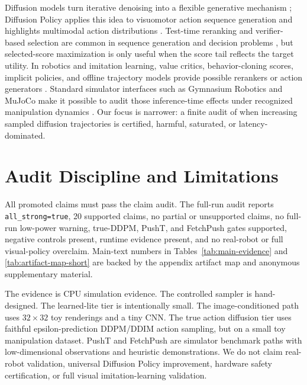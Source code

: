 \documentclass{article}
\begin{document}
Diffusion models turn iterative denoising into a flexible generative mechanism \citep{sohl2015deep,ho2020ddpm,song2020ddim}; Diffusion Policy applies this idea to visuomotor action sequence generation and highlights multimodal action distributions \citep{chi2023diffusionpolicy}. Test-time reranking and verifier-based selection are common in sequence generation and decision problems \citep{cobbe2021training,yao2023tree}, but selected-score maximization is only useful when the score tail reflects the target utility. In robotics and imitation learning, value critics, behavior-cloning scores, implicit policies, and offline trajectory models provide possible rerankers or action generators \citep{florence2022implicit,janner2022diffuser,mandlekar2021robomimic}. Standard simulator interfaces such as Gymnasium Robotics and MuJoCo make it possible to audit those inference-time effects under recognized manipulation dynamics \citep{towers2024gymnasium,todorov2012mujoco}. Our focus is narrower: a finite audit of when increasing sampled diffusion trajectories is certified, harmful, saturated, or latency-dominated.

\section{Audit Discipline and Limitations}

All promoted claims must pass the claim audit. The full-run audit reports \texttt{all\_strong=true}, 20 supported claims, no partial or unsupported claims, no full-run low-power warning, true-DDPM, PushT, and FetchPush gates supported, negative controls present, runtime evidence present, and no real-robot or full visual-policy overclaim. Main-text numbers in Tables~\ref{tab:main-evidence} and \ref{tab:artifact-map-short} are backed by the appendix artifact map and anonymous supplementary material.

The evidence is CPU simulation evidence. The controlled sampler is hand-designed. The learned-lite tier is intentionally small. The image-conditioned path uses $32{\times}32$ toy renderings and a tiny CNN. The true action diffusion tier uses faithful epsilon-prediction DDPM/DDIM action sampling, but on a small toy manipulation dataset. PushT and FetchPush are simulator benchmark paths with low-dimensional observations and heuristic demonstrations. We do not claim real-robot validation, universal Diffusion Policy improvement, hardware safety certification, or full visual imitation-learning validation.
\end{document}
